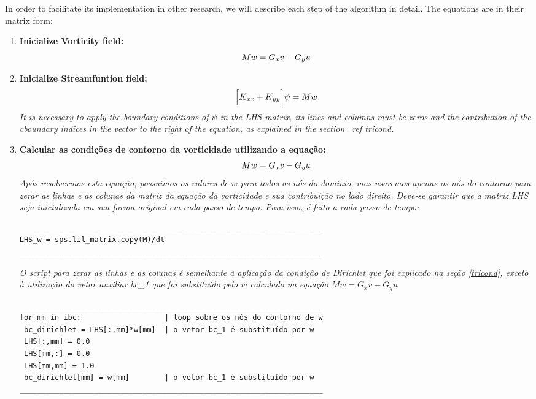 \medskip
In order to facilitate its implementation in other research, 
we will describe each step of the algorithm in detail. 
The equations are in their matrix form:

\begin{enumerate}
 \item \textbf{Inicialize Vorticity field:}
 \begin{equation}
  Mw = G_{x}v - G_{y}u \notag
 \end{equation}

 \item \textbf{Inicialize Streamfuntion field:}
  \begin{equation}
  \Big[ K_{xx} + K_{yy} \Big] \psi = Mw \notag
  \end{equation}
  \textit{
It is necessary to apply the boundary conditions of $\psi $ in 
the LHS matrix, its lines and columns must be zeros and 
the contribution of the cboundary indices in the vector to the right of the equation, as explained in the section \ ref {tricond}.}


 \item \textbf{Calcular as condições de contorno da vorticidade utilizando a equação:}
 \begin{equation}
  Mw = G_{x}v - G_{y}u \notag
 \end{equation}
 \textit{Após resolvermos esta equação, possuímos os valores de $w$ para todos
 os nós do domínio, mas usaremos apenas os nós do contorno
 para zerar as linhas e as colunas da matriz da equação da vorticidade 
 e sua contribuição no lado direito. Deve-se garantir que a matriz LHS 
 seja inicializada em sua forma original em cada passo de tempo. 
 Para isso, é feito a cada passo de tempo:}

\begin{verbatim}
_____________________________________________________________________
LHS_w = sps.lil_matrix.copy(M)/dt
_____________________________________________________________________
\end{verbatim}

 \textit{O script para zerar as linhas e as colunas é
 semelhante à aplicação da condição de Dirichlet
 que foi explicado na seção \ref{tricond},
 exceto à utilização do vetor auxiliar bc\_1 que
 foi substituído pelo $w$ calculado na
 equação $Mw = G_{x}v - G_{y}u$}

\begin{verbatim}
_____________________________________________________________________
for mm in ibc:                   | loop sobre os nós do contorno de w
 bc_dirichlet = LHS[:,mm]*w[mm]  | o vetor bc_1 é substituído por w
 LHS[:,mm] = 0.0                     
 LHS[mm,:] = 0.0                     
 LHS[mm,mm] = 1.0                    
 bc_dirichlet[mm] = w[mm]        | o vetor bc_1 é substituído por w
_____________________________________________________________________
\end{verbatim}


\end{enumerate}
